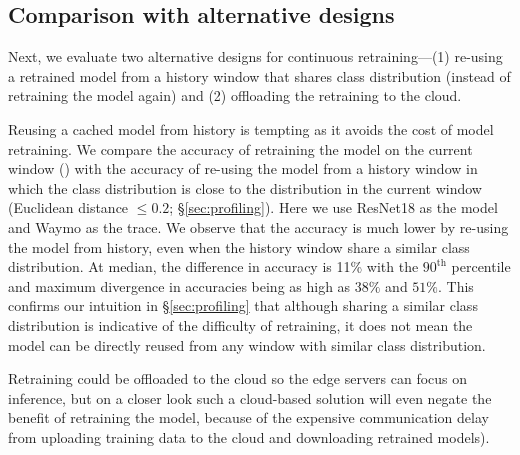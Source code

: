 \subsection{Comparison with alternative designs}
\label{subsec:eval-alternate}

Next, we evaluate two alternative designs for continuous retraining---(1) re-using a retrained model from a history window that shares class distribution (instead of retraining the model again) and (2) offloading the retraining to the cloud.

Reusing a cached model from history is tempting as it avoids the cost of model retraining. 
We compare the accuracy of retraining the model on the current window (\name) with the accuracy of re-using the model from a history window in which the class distribution is close to the distribution in the current window (Euclidean distance $\leq 0.2$; \S\ref{sec:profiling}). Here we use ResNet18 as the model and Waymo as the trace.
We observe that 
the accuracy is much lower by re-using the model from history, even when the history window share a similar class distribution. At median, the difference in accuracy is 11\% with the $90^\text{th}$ percentile and maximum divergence in accuracies being as high as $38\%$ and $51\%$. 
This confirms our intuition in \S\ref{sec:profiling} that although sharing a similar class distribution is indicative of the difficulty of retraining, it does not mean the model can be directly reused from any window with similar class distribution.




Retraining could be offloaded to the cloud so the edge servers can focus on inference, but on a closer look such a cloud-based solution will even negate the benefit of retraining the model, because of the expensive communication delay from uploading training data to the cloud and downloading retrained models). 

